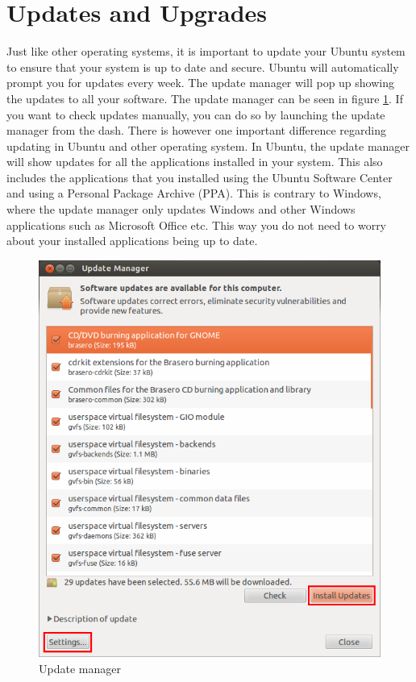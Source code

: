 \section{Updates and Upgrades}  
Just like other operating systems, it is important to update your Ubuntu system to ensure that your system is up to date and secure. Ubuntu will automatically prompt you for updates every week. The update manager will pop up showing the updates to all your software. The update manager can be seen in figure \ref{fig:update-manager}. If you want to check updates manually, you can do so by launching the update manager from the dash. There is however one important difference regarding updating in Ubuntu and other operating system. In Ubuntu, the update manager will show updates for all the applications installed in your system. This also includes the applications that you installed using the Ubuntu Software Center and using a Personal Package Archive (PPA). This is contrary to Windows, where the update manager only updates Windows and other Windows applications such as Microsoft Office etc. This way you do not need to worry about your installed applications being up to date. \\

\begin{figure}[h!]	
	\centering
	\includegraphics[width=325pt]{./images/applications/update-manager.png}
	\caption{Update manager}	
	\label{fig:update-manager}		
\end{figure}

